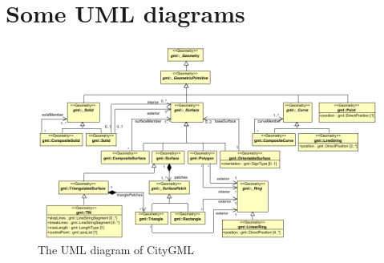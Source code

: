 

\chapter{Some UML diagrams}

\begin{figure}
  \centering
  \includegraphics[angle=90,width=0.9\linewidth]{figs/citygmlgeom.pdf}
  \caption{The UML diagram of CityGML}
\label{fig:citygmlgeom}
\end{figure}